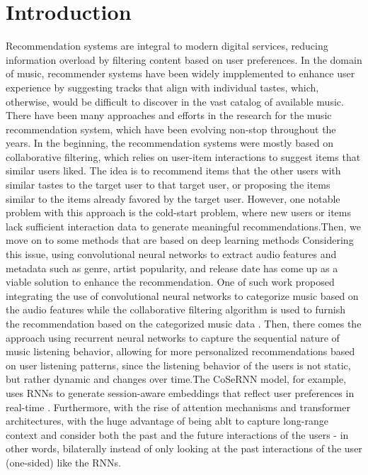 \documentclass[12pt]{article}
\begin{document}
\section{Introduction}
Recommendation systems are integral to modern digital services, reducing
information overload by filtering content based on user preferences. In the
domain of music, recommender systems have been widely impplemented to enhance
user experience by suggesting tracks that align with individual tastes, which,
otherwise, would be difficult to discover in the vast catalog of available
music. There have been many approaches and efforts in the research for the
music recommendation system, which have been evolving non-stop throughout the
years. In the beginning, the recommendation systems were mostly based on
collaborative filtering, which relies on user-item interactions to suggest
items that similar users liked. The idea is to recommend items that the other
users with similar tastes to the target user to that target user, or proposing
the items similar to the items already favored by the target user. However, one
notable problem with this approach is the cold-start problem, where new users
or items lack sufficient interaction data to generate meaningful
recommendations.Then, we move on to some methods that are based on deep
learning methods Considering this issue, using convolutional neural networks to
extract audio features and metadata such as genre, artist popularity, and
release date has come up as a viable solution to enhance the recommendation.
One of such work proposed integrating the use of convolutional neural networks
to categorize music based on the audio features while the collaborative
filtering algorithm is used to furnish the recommendation based on the
categorized music data \cite{mrcnn}. Then, there comes the approach using
recurrent neural networks to capture the sequential nature of music listening
behavior, allowing for more personalized recommendations based on user
listening patterns, since the listening behavior of the users is not static,
but rather dynamic and changes over time.The CoSeRNN model, for example, uses
RNNs to generate session-aware embeddings that reflect user preferences in
real-time \cite{hansen2020contextual}. Furthermore, with the rise of attention
mechanisms and transformer architectures, with the huge advantage of being ablt
to capture long-range context and consider both the past and the future
interactions of the users - in other words, bilaterally instead of only looking
at the past interactions of the user (one-sided) like the RNNs.
\end{document}
